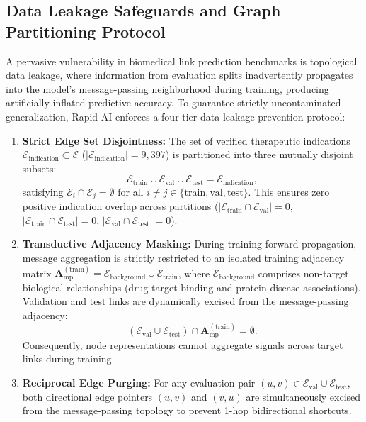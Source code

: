 \documentclass[preprint,12pt]{elsarticle}
\begin{document}
\subsection{Data Leakage Safeguards and Graph Partitioning Protocol}
A pervasive vulnerability in biomedical link prediction benchmarks is topological data leakage, where information from evaluation splits inadvertently propagates into the model's message-passing neighborhood during training, producing artificially inflated predictive accuracy. To guarantee strictly uncontaminated generalization, Rapid AI enforces a four-tier data leakage prevention protocol:

\begin{enumerate}
    \item \textbf{Strict Edge Set Disjointness:} The set of verified therapeutic indications $\mathcal{E}_{\mathrm{indication}} \subset \mathcal{E}$ ($|\mathcal{E}_{\mathrm{indication}}| = 9,397$) is partitioned into three mutually disjoint subsets:
    \begin{equation}
        \mathcal{E}_{\mathrm{train}} \cup \mathcal{E}_{\mathrm{val}} \cup \mathcal{E}_{\mathrm{test}} = \mathcal{E}_{\mathrm{indication}},
    \end{equation}
    satisfying $\mathcal{E}_i \cap \mathcal{E}_j = \emptyset$ for all $i \neq j \in \{\mathrm{train}, \mathrm{val}, \mathrm{test}\}$. This ensures zero positive indication overlap across partitions ($|\mathcal{E}_{\mathrm{train}} \cap \mathcal{E}_{\mathrm{val}}| = 0$, $|\mathcal{E}_{\mathrm{train}} \cap \mathcal{E}_{\mathrm{test}}| = 0$, $|\mathcal{E}_{\mathrm{val}} \cap \mathcal{E}_{\mathrm{test}}| = 0$).
    \item \textbf{Transductive Adjacency Masking:} During training forward propagation, message aggregation is strictly restricted to an isolated training adjacency matrix $\mathbf{A}_{\mathrm{mp}}^{(\mathrm{train})} = \mathcal{E}_{\mathrm{background}} \cup \mathcal{E}_{\mathrm{train}}$, where $\mathcal{E}_{\mathrm{background}}$ comprises non-target biological relationships (drug-target binding and protein-disease associations). Validation and test links are dynamically excised from the message-passing adjacency:
    \begin{equation}
        (\mathcal{E}_{\mathrm{val}} \cup \mathcal{E}_{\mathrm{test}}) \cap \mathbf{A}_{\mathrm{mp}}^{(\mathrm{train})} = \emptyset.
    \end{equation}
    Consequently, node representations cannot aggregate signals across target links during training.
    \item \textbf{Reciprocal Edge Purging:} For any evaluation pair $(u, v) \in \mathcal{E}_{\mathrm{val}} \cup \mathcal{E}_{\mathrm{test}}$, both directional edge pointers $(u, v)$ and $(v, u)$ are simultaneously excised from the message-passing topology to prevent 1-hop bidirectional shortcuts.

\end{enumerate}
\end{document}
